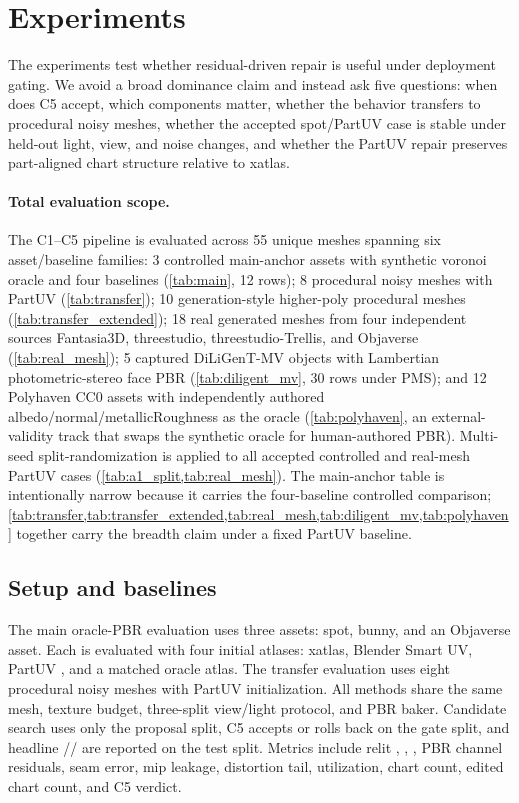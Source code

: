 \section{Experiments}
\label{sec:experiments}

The experiments test whether residual-driven repair is useful under deployment gating. We avoid a broad dominance claim and instead ask five questions: when does C5 accept, which components matter, whether the behavior transfers to procedural noisy meshes, whether the accepted spot/PartUV case is stable under held-out light, view, and noise changes, and whether the PartUV repair preserves part-aligned chart structure relative to xatlas.

\paragraph*{Total evaluation scope.} The C1--C5 pipeline is evaluated across 55 unique meshes spanning six asset/baseline families: 3 controlled main-anchor assets with synthetic voronoi oracle and four baselines (\cref{tab:main}, 12 rows); 8 procedural noisy meshes with PartUV (\cref{tab:transfer}); 10 generation-style higher-poly procedural meshes (\cref{tab:transfer_extended}); 18 real generated meshes from four independent sources Fantasia3D, threestudio, threestudio-Trellis, and Objaverse (\cref{tab:real_mesh}); 5 captured DiLiGenT-MV objects with Lambertian photometric-stereo face PBR (\cref{tab:diligent_mv}, 30 rows under PMS); and 12 Polyhaven CC0 assets with independently authored albedo/normal/metallicRoughness as the oracle (\cref{tab:polyhaven}, an external-validity track that swaps the synthetic oracle for human-authored PBR). Multi-seed split-randomization is applied to all accepted controlled and real-mesh PartUV cases (\cref{tab:a1_split,tab:real_mesh}). The main-anchor table is intentionally narrow because it carries the four-baseline controlled comparison; \cref{tab:transfer,tab:transfer_extended,tab:real_mesh,tab:diligent_mv,tab:polyhaven} together carry the breadth claim under a fixed PartUV baseline.

\subsection{Setup and baselines}
\label{sec:exp_setup}

The main oracle-PBR evaluation uses three assets: spot, bunny, and an Objaverse asset. Each is evaluated with four initial atlases: xatlas, Blender Smart UV, PartUV \cite{wang2025_partuv_part_based_uv}, and a matched oracle atlas. The transfer evaluation uses eight procedural noisy meshes with PartUV initialization. All methods share the same mesh, texture budget, three-split view/light protocol, and PBR baker. Candidate search uses only the proposal split, C5 accepts or rolls back on the gate split, and headline \PSNR{}/\SSIM{}/\LPIPS{} are reported on the test split. Metrics include relit \PSNR, \SSIM, \LPIPS, PBR channel residuals, seam error, mip leakage, distortion tail, utilization, chart count, edited chart count, and C5 verdict.

